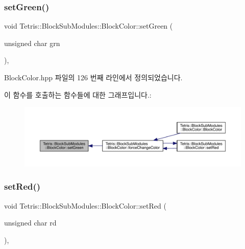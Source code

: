 \subsubsection{\texorpdfstring{set\+Green()}{setGreen()}}
{\footnotesize\ttfamily void Tetris\+::\+Block\+Sub\+Modules\+::\+Block\+Color\+::set\+Green (\begin{DoxyParamCaption}\item[{unsigned char}]{grn }\end{DoxyParamCaption})\hspace{0.3cm}{\ttfamily [inline]}, {\ttfamily [protected]}}



Block\+Color.\+hpp 파일의 126 번째 라인에서 정의되었습니다.

이 함수를 호출하는 함수들에 대한 그래프입니다.\+:
\nopagebreak
\begin{figure}[H]
\begin{center}
\leavevmode
\includegraphics[width=350pt]{class_tetris_1_1_block_sub_modules_1_1_block_color_aeea8ab6d5f36d35fd4f28818349661ab_icgraph}
\end{center}
\end{figure}
\mbox{\label{class_tetris_1_1_block_sub_modules_1_1_block_color_a9541e6b5b809214ae2691a99af06ac3f}} 
\subsubsection{\texorpdfstring{set\+Red()}{setRed()}}
{\footnotesize\ttfamily void Tetris\+::\+Block\+Sub\+Modules\+::\+Block\+Color\+::set\+Red (\begin{DoxyParamCaption}\item[{unsigned char}]{rd }\end{DoxyParamCaption})\hspace{0.3cm}{\ttfamily [inline]}, {\ttfamily [protected]}}




